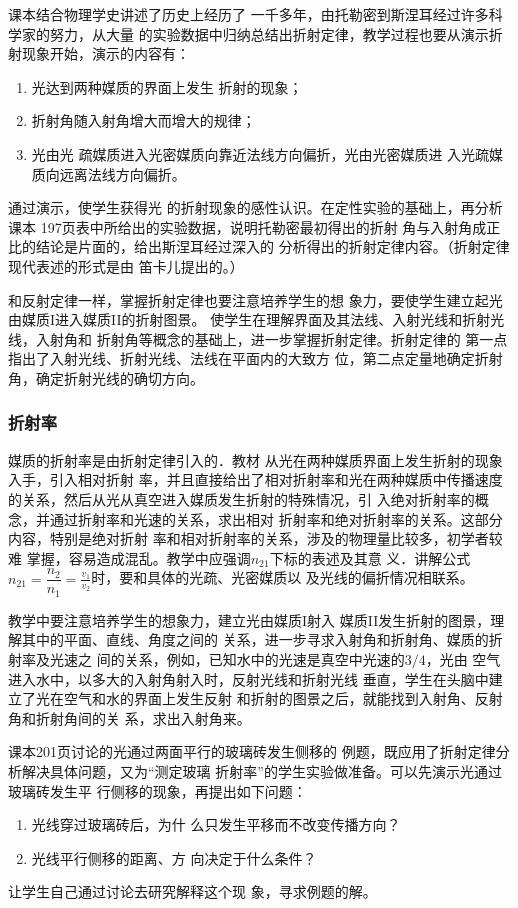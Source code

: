 课本结合物理学史讲述了历史上经历了
一千多年，由托勒密到斯涅耳经过许多科学家的努力，从大量
的实验数据中归纳总结出折射定律，教学过程也要从演示折
射现象开始，演示的内容有：
\begin{enumerate}
\item 光达到两种媒质的界面上发生
折射的现象；
\item 折射角随入射角增大而增大的规律；
\item 光由光
疏媒质进入光密媒质向靠近法线方向偏折，光由光密媒质进
入光疏媒质向远离法线方向偏折。
\end{enumerate}
通过演示，使学生获得光
的折射现象的感性认识。在定性实验的基础上，再分析课本
197页表中所给出的实验数据，说明托勒密最初得出的折射
角与入射角成正比的结论是片面的，给出斯涅耳经过深入的
分析得出的折射定律内容。（折射定律现代表述的形式是由
笛卡儿提出的。）

和反射定律一样，掌握折射定律也要注意培养学生的想
象力，要使学生建立起光由媒质I进入媒质II的折射图景。
使学生在理解界面及其法线、入射光线和折射光线，入射角和
折射角等概念的基础上，进一步掌握折射定律。折射定律的
第一点指出了入射光线、折射光线、法线在平面内的大致方
位，第二点定量地确定折射角，确定折射光线的确切方向。

\subsubsection{折射率}

媒质的折射率是由折射定律引入的．教材
从光在两种媒质界面上发生折射的现象入手，引入相对折射
率，并且直接给出了相对折射率和光在两种媒质中传播速度
的关系，然后从光从真空进入媒质发生折射的特殊情况，引
入绝对折射率的概念，并通过折射率和光速的关系，求出相对
折射率和绝对折射率的关系。这部分内容，特别是绝对折射
率和相对折射率的关系，涉及的物理量比较多，初学者较难
掌握，容易造成混乱。教学中应强调$n_{21}$下标的表述及其意
义．讲解公式$n_{21}=\dfrac{n_2}{n_1}=\frac{v_1}{v_2}$时，要和具体的光疏、光密媒质以
及光线的偏折情况相联系。

教学中要注意培养学生的想象力，建立光由媒质I射入
媒质II发生折射的图景，理解其中的平面、直线、角度之间的
关系，进一步寻求入射角和折射角、媒质的折射率及光速之
间的关系，例如，已知水中的光速是真空中光速的$3/4$，光由
空气进入水中，以多大的入射角射入时，反射光线和折射光线
垂直，学生在头脑中建立了光在空气和水的界面上发生反射
和折射的图景之后，就能找到入射角、反射角和折射角间的关
系，求出入射角来。

课本201页讨论的光通过两面平行的玻璃砖发生侧移的
例题，既应用了折射定律分析解决具体问题，又为“测定玻璃
折射率”的学生实验做准备。可以先演示光通过玻璃砖发生平
行侧移的现象，再提出如下问题：
\begin{enumerate}
\item 光线穿过玻璃砖后，为什
么只发生平移而不改变传播方向？
\item 光线平行侧移的距离、方
向决定于什么条件？
\end{enumerate}
让学生自己通过讨论去研究解释这个现
象，寻求例题的解。


